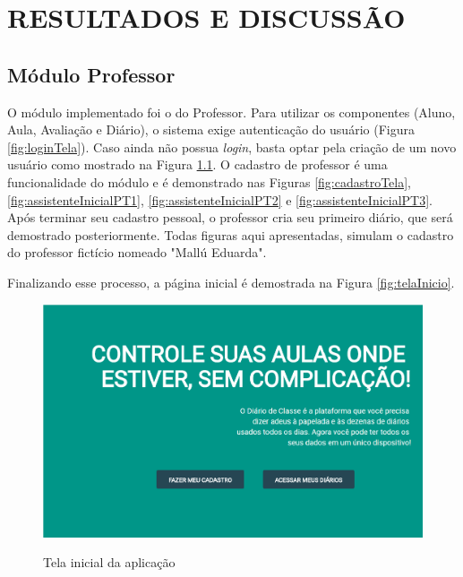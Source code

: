 \chapter{RESULTADOS E DISCUSSÃO}
\label{cap:resultados}

\section{Módulo Professor}


O módulo implementado foi o do Professor. Para utilizar os componentes (Aluno, Aula, Avaliação e Diário), o sistema exige autenticação do usuário (Figura \ref{fig:loginTela}). Caso ainda não possua \textit{login}, basta optar pela criação de um novo usuário como mostrado na Figura \ref{fig:index}. O cadastro de professor é uma funcionalidade do módulo e é demonstrado nas Figuras \ref{fig:cadastroTela}, \ref{fig:assistenteInicialPT1}, \ref{fig:assistenteInicialPT2} e \ref{fig:assistenteInicialPT3}. Após terminar seu cadastro pessoal, o professor cria seu primeiro diário, que será demostrado posteriormente. Todas figuras aqui apresentadas, simulam o cadastro do professor fictício nomeado "Mallú Eduarda".

Finalizando esse processo, a página inicial é demostrada na Figura \ref{fig:telaInicio}. 

\begin{figure}[!htb]
	\centering
	\caption{Tela inicial da aplicação} %
	\includegraphics[scale=0.4]{index}\\  %
	{\small } %
	\label{fig:index} %
\end{figure}

